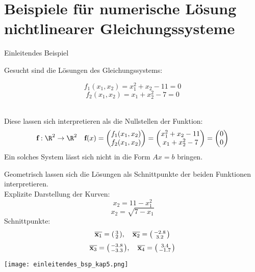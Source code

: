 \section{Beispiele für numerische Lösung nichtlinearer Gleichungssysteme}

\begin{example2}{Einleitendes Beispiel}

    \begin{minipage}{0.4\linewidth}
        Gesucht sind die Lösungen des Gleichungssystems:
    \end{minipage}
    \begin{minipage}{0.55\linewidth}
        \vspace{-6mm}
    $$f_1(x_1, x_2) = x_1^2 + x_2 - 11 = 0$$
    $$f_2(x_1, x_2) = x_1 + x_2^2 - 7 = 0$$
    \end{minipage}
    \vspace{1mm}\\
    Diese lassen sich interpretieren als die Nullstellen der Funktion:
    $$\textbf{f}: \R^2 \to \R^2 \quad \textbf{f}(x) = \begin{pmatrix} f_1 (x_1, x_2) \\ f_2 (x_1, x_2) \end{pmatrix} = \begin{pmatrix} x_1^2 + x_2 - 11 \\ x_1 + x_2^2 - 7 \end{pmatrix} = \begin{pmatrix} 0\\ 0 \end{pmatrix}$$
    Ein solches System lässt sich nicht in die Form $Ax = b$ bringen. 

    \begin{minipage}{0.5\linewidth}
    Geometrisch lassen sich die Lösungen als Schnittpunkte der beiden Funktionen interpretieren.\\
    Explizite Darstellung der Kurven:
    $$x_2 = 11 - x_1^2$$
    $$x_2 = \sqrt{7 - x_1}$$
    Schnittpunkte:
    $$\overline{\textbf{x}_1} = \begin{psmallmatrix} 3 \\ 2 \end{psmallmatrix}, \quad \overline{\textbf{x}_2} = \begin{psmallmatrix} -2.8 \\ 3.2 \end{psmallmatrix}$$
    $$\overline{\textbf{x}_3} = \begin{psmallmatrix} -3.8 \\ -3.3 \end{psmallmatrix}, \quad \overline{\textbf{x}_4} = \begin{psmallmatrix} 3.4 \\ -1.7 \end{psmallmatrix}$$
    \end{minipage}
    \begin{minipage}{0.5\linewidth}
    \texttt{[image: einleitendes\_bsp\_kap5.png]}
    \end{minipage}
\end{example2}

